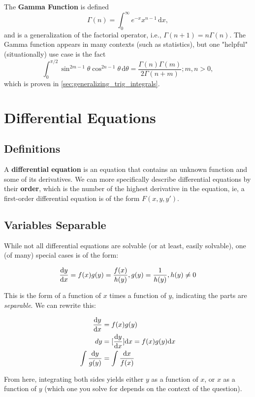 \documentclass[12pt]{article}
\begin{document}
The \textbf{Gamma Function} is defined \[\Gamma(n) = \int_0^\infty e^{-x} x^{n-1} \,\text{d}x,\] and is a generalization of the factorial operator, i.e., $\Gamma(n + 1) = n\Gamma(n)$. The Gamma function appears in many contexts (such as statistics), but one "helpful" (situationally) use case is the fact \[\int_0^{\pi/2} \sin^{2m-1}\theta\cos^{2n-1}\theta \,\text{d}\theta = \frac{\Gamma(n)\Gamma(m)}{2\Gamma(n+m)}; m,n > 0,\] which is proven in \ref{sec:generalizing_trig_integrals}.

\section{Differential Equations}
\subsection{Definitions}

A \textbf{differential equation} is an equation that contains an unknown function and some of its derivatives. We can more specifically describe differential equations by their \textbf{order}, which is the number of the highest derivative in the equation, ie, a first-order differential equation is of the form $F(x,y,y')$.

\subsection{Variables Separable}\label{sec:separable}

While not all differential equations are solvable (or at least, easily solvable), one (of many) special cases is of the form:

\[
\frac{\text{d}y}{\text{d}x} = f(x)g(y) = \frac{f(x)}{h(y)}, g(y) = \frac{1}{h(y)}, h(y) \neq 0
\]

This is the form of a function of $x$ times a function of $y$, indicating the parts are \textit{separable}. We can rewrite this:

\begin{equation}
    \begin{split}
        \frac{\text{d}y}{\text{d}x} &= f(x)g(y)\\
        dy &= [\frac{\text{d}y}{\text{d}x}] \text{d}x = f(x)g(y)\text{d}x\\
        \int \frac{\text{d}y}{g(y)} &= \int \frac{\text{d}x}{f(x)}
    \end{split}
\end{equation}

From here, integrating both sides yields either $y$ as a function of $x$, or $x$ as a function of $y$ (which one you solve for depends on the context of the question).
\end{document}
